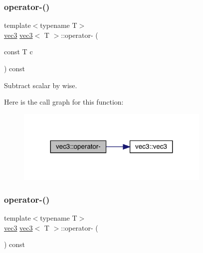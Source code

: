 \subsubsection{\texorpdfstring{operator-\/()}{operator-()}\hspace{0.1cm}{\footnotesize\ttfamily [2/3]}}
{\footnotesize\ttfamily template$<$typename T$>$ \\
\mbox{\hyperlink{structvec3}{vec3}} \mbox{\hyperlink{structvec3}{vec3}}$<$ T $>$\+::operator-\/ (\begin{DoxyParamCaption}\item[{const T}]{c }\end{DoxyParamCaption}) const\hspace{0.3cm}{\ttfamily [inline]}}



Subtract scalar by wise. 

Here is the call graph for this function\+:\nopagebreak
\begin{figure}[H]
\begin{center}
\leavevmode
\includegraphics[width=263pt]{structvec3_a4c45d24dd69ba07e484e2951933d2f97_cgraph}
\end{center}
\end{figure}
\mbox{\label{structvec3_a9ee0d5d83bd70141b9424928d0ea9c98}} 
\subsubsection{\texorpdfstring{operator-\/()}{operator-()}\hspace{0.1cm}{\footnotesize\ttfamily [3/3]}}
{\footnotesize\ttfamily template$<$typename T$>$ \\
\mbox{\hyperlink{structvec3}{vec3}} \mbox{\hyperlink{structvec3}{vec3}}$<$ T $>$\+::operator-\/ (\begin{DoxyParamCaption}{ }\end{DoxyParamCaption}) const\hspace{0.3cm}{\ttfamily [inline]}}



